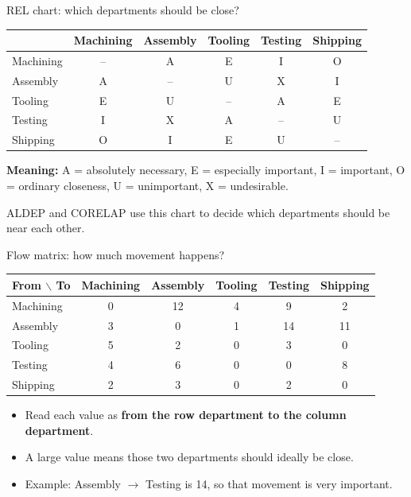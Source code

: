 \documentclass[aspectratio=169,10pt]{beamer}
\begin{document}
\begin{frame}[t]{REL chart: which departments should be close?}
  \centering
  \small
  \begin{tabular}{@{}lccccc@{}}
    \toprule
    & Machining & Assembly & Tooling & Testing & Shipping \\
    \midrule
    Machining & -- & A & E & I & O \\
    Assembly  & A  & -- & U & X & I \\
    Tooling   & E  & U  & -- & A & E \\
    Testing   & I  & X  & A  & -- & U \\
    Shipping  & O  & I  & E  & U  & -- \\
    \bottomrule
  \end{tabular}

  \vspace{0.6em}
  \RaggedRight
  \footnotesize
  \textbf{Meaning:}
  A = absolutely necessary, E = especially important, I = important,
  O = ordinary closeness, U = unimportant, X = undesirable.

  \medskip
  ALDEP and CORELAP use this chart to decide which departments should be near each other.
\end{frame}

\begin{frame}[t]{Flow matrix: how much movement happens?}
  \centering
  \footnotesize
  \begin{tabular}{@{}lccccc@{}}
    \toprule
    From $\backslash$ To & Machining & Assembly & Tooling & Testing & Shipping \\
    \midrule
    Machining & 0 & 12 & 4 & 9  & 2  \\
    Assembly  & 3 & 0  & 1 & 14 & 11 \\
    Tooling   & 5 & 2  & 0 & 3  & 0  \\
    Testing   & 4 & 6  & 0 & 0  & 8  \\
    Shipping  & 2 & 3  & 0 & 2  & 0  \\
    \bottomrule
  \end{tabular}

  \vspace{0.45em}
  \RaggedRight
  \small
  \begin{itemize}
    \setlength{\itemsep}{0.35em}
    \item Read each value as \textbf{from the row department to the column department}.
    \item A large value means those two departments should ideally be close.
    \item Example: Assembly $\rightarrow$ Testing is 14, so that movement is very important.
  \end{itemize}
\end{frame}
\end{document}
